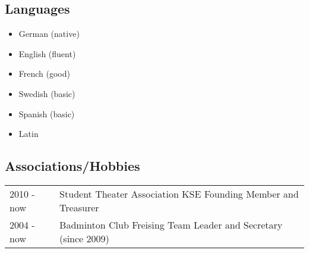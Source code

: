 \documentclass[a4paper,10pt]{memoir}
\begin{document}
\subsection*{Languages}
\vspace*{-\baselineskip}
\begin{multicols}{3}
  \begin{itemize}
    \item German (native)
    \item English (fluent)
    \item French (good)
    \item Swedish (basic)
    \item Spanish (basic)
    \item Latin
  \end{itemize}
\end{multicols}

\subsection*{Associations/Hobbies}
\vspace*{-\baselineskip}
\begin{longtable}{@{}p{} p{}}
  2010 - now &
  Student Theater Association KSE \newline 
  Founding Member and Treasurer
  \\
  2004 - now &
  Badminton Club Freising \newline 
  Team Leader and Secretary (since 2009)
\end{longtable}
\end{document}
